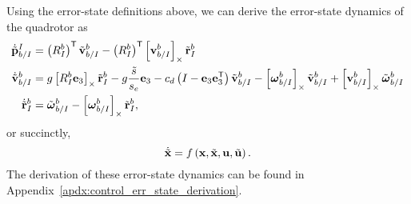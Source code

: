 Using the error-state definitions above, we can derive the error-state dynamics
of the quadrotor as
\begin{align}
        \dot{\tilde{\boldsymbol{\mathrm{p}}}}_{b/I}^{I} &= \left(R_{I}^{b}\right)^{\mathsf{T}}
          \tilde{\boldsymbol{\mathrm{v}}}_{b/I}^{b} - \left(R_{I}^{b}\right)^{\mathsf{T}}
          \left[ \boldsymbol{\mathrm{v}}_{b/I}^{b} \right]_{\times} \tilde{\boldsymbol{\mathrm{r}}}_I^b \nonumber\\
        \dot{\tilde{\boldsymbol{\mathrm{v}}}}_{b/I}^{b} &= g\left[ R_I^b
          \boldsymbol{\mathrm{e}}_3 \right]_{\times} \tilde{\boldsymbol{\mathrm{r}}}_I^b -g\frac{\tilde{s}}{s_e}\boldsymbol{\mathrm{e}}_3
          -c_d \left( I - \boldsymbol{\mathrm{e}}_3 \boldsymbol{\mathrm{e}}_3^{\mathsf{T}} \right)
          \tilde{\boldsymbol{\mathrm{v}}}_{b/I}^b 
                                         - \left[ \boldsymbol{\mathrm{\omega}}_{b/I}^b \right]_{\times}
          \tilde{\boldsymbol{\mathrm{v}}}_{b/I}^b + \left[ \boldsymbol{\mathrm{v}}_{b/I}^b \right]_{\times}
          \tilde{\boldsymbol{\mathrm{\omega}}}_{b/I}^b 
          \label{eq:error_state_dynamics}
          \\
          \dot{\tilde{\boldsymbol{\mathrm{r}}}}_{I}^{b} &= \tilde{\boldsymbol{\mathrm{\omega}}}_{b/I}^{b} -
        \left[ \boldsymbol{\mathrm{\omega}}_{b/I}^{b}  \right]_{\times} \tilde{\boldsymbol{\mathrm{r}}}_I^b, \nonumber
\end{align}
or succinctly,
\begin{equation}
  \dot{\tilde{\boldsymbol{\mathrm{x}}}} = f\left(\boldsymbol{\mathrm{x}}, \tilde{\boldsymbol{\mathrm{x}}}, \boldsymbol{\mathrm{u}}, \tilde{\boldsymbol{\mathrm{u}}}\right).
\end{equation}
The derivation of these error-state dynamics can be found in
Appendix~\ref{apdx:control_err_state_derivation}.


